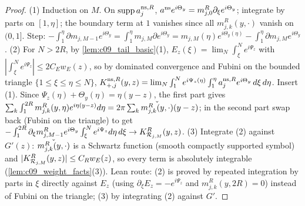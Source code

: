 \begin{proof}
  (1) Induction on $M$. On $\operatorname{supp}a_j^{\textup{ns},R}$, $a^{\textup{ns}}e^{i\Theta_y}=m_{j,0}^R\partial_\xi e^{i\Theta_y}$; integrate by parts on $[1,\eta]$; the boundary
  term at $1$ vanishes since all $m_{j,k}^R(y,\cdot)$ vanish on $(0,1]$. Step: $-\int_1^\eta\partial m_{j,M-1}e^{i\Theta_y}=\int_1^\eta m_{j,M}\partial e^{i\Theta_y}
  =m_{j,M}(\eta)e^{i\Theta_y(\eta)}-\int_1^\eta\partial m_{j,M}e^{i\Theta_y}$.
  (2) For $N>2R$, by \cref{lem:c09_tail_basic}(1), $E_z(\xi)=\lim_N\int_\xi^Ne^{i\Psi_z}$ with $|\int_\xi^N e^{i\Psi_z}|\le2C_Ew_E(z)$, so by dominated convergence and
  Fubini on the bounded triangle $\{1\le\xi\le\eta\le N\}$,
  $K_{+,j}^{\textup{ns},R}(y,z)=\lim_N\int_1^Ne^{i\Psi_z(\eta)}\int_1^{\eta}a_j^{\textup{ns},R}e^{i\Theta_y}\,d\xi\,d\eta$. Insert (1). Since
  $\Psi_z(\eta)+\Theta_y(\eta)=\eta(y-z)$, the first part gives $\sum_k\int_1^{2R}m_{j,k}^R(y,\eta)e^{i\eta(y-z)}d\eta=2\pi\sum_k\widecheck{m^R_{j,k}(y,\cdot)}(y-z)$;
  in the second part swap back (Fubini on the triangle) to get $-\int_1^{2R}\partial_\xi m^R_{j,M-1}e^{i\Theta_y}\int_\xi^Ne^{i\Psi_z}d\eta\,d\xi\to K^R_{\mc R_{j,M}}(y,z)$.
  (3) Integrate (2) against $G'(z)$: $\widecheck{m^R_{j,k}(y,\cdot)}$ is a Schwartz function (smooth compactly supported symbol) and
  $|K^R_{\mc R_{j,M}}(y,z)|\le C_Rw_E(z)$, so every term is absolutely integrable (\cref{lem:c09_weight_facts}(3)).
  Lean route: (2) is proved by repeated integration by parts in $\xi$ directly against $E_z$ (using $\partial_\xi E_z=-e^{i\Psi_z}$ and $m_{j,k}^R(y,2R)=0$) instead of Fubini on the triangle; (3) by integrating (2) against $G'$.
\end{proof}

